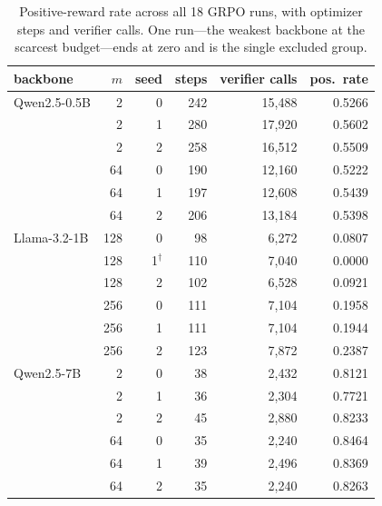 \begin{table}[t]\centering\small
\setlength{\tabcolsep}{4pt}
\caption{Positive-reward rate across all 18 GRPO runs, with optimizer steps
and verifier calls. One run---the weakest backbone at the scarcest
budget---ends at zero and is the single excluded group.}
\label{tab:supp-stability}
\begin{tabular}{l rr rrr}
\toprule
backbone & $m$ & seed & steps & verifier calls & pos.\ rate \\
\midrule
Qwen2.5-0.5B & 2 & 0 & 242 & 15{,}488 & 0.5266 \\
 & 2 & 1 & 280 & 17{,}920 & 0.5602 \\
 & 2 & 2 & 258 & 16{,}512 & 0.5509 \\
 & 64 & 0 & 190 & 12{,}160 & 0.5222 \\
 & 64 & 1 & 197 & 12{,}608 & 0.5439 \\
 & 64 & 2 & 206 & 13{,}184 & 0.5398 \\
Llama-3.2-1B & 128 & 0 & 98 & 6{,}272 & 0.0807 \\
 & 128 & 1$^{\dagger}$ & 110 & 7{,}040 & 0.0000 \\
 & 128 & 2 & 102 & 6{,}528 & 0.0921 \\
 & 256 & 0 & 111 & 7{,}104 & 0.1958 \\
 & 256 & 1 & 111 & 7{,}104 & 0.1944 \\
 & 256 & 2 & 123 & 7{,}872 & 0.2387 \\
Qwen2.5-7B & 2 & 0 & 38 & 2{,}432 & 0.8121 \\
 & 2 & 1 & 36 & 2{,}304 & 0.7721 \\
 & 2 & 2 & 45 & 2{,}880 & 0.8233 \\
 & 64 & 0 & 35 & 2{,}240 & 0.8464 \\
 & 64 & 1 & 39 & 2{,}496 & 0.8369 \\
 & 64 & 2 & 35 & 2{,}240 & 0.8263 \\
\bottomrule
\end{tabular}
\end{table}
